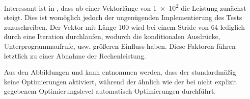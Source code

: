 Interessant ist in , dass ab einer Vektorlänge von \num{1e2} die
Leistung zunächst steigt. Dies ist womöglich jedoch der ungenügenden Implementierung
des Tests zuzuschreiben. Der Vektor mit Länge 100 wird bei einem Stride von 64
lediglich durch eine Iteration durchlaufen, wodurch die konditionalen Ausdrücke,
Unterprogrammaufrufe, usw. größeren Einfluss haben. Diese Faktoren führen letztlich
zu einer Abnahme der Rechenleistung.

Aus den Abbildungen  und  kann entnommen werden,
dass der \gcc standardmäßig keine Optimierungen aktiviert, während der \icc ähnlich
wie der \pgcc bei nicht explizit gegebenem Optimierungslevel automatisch Optimierungen
durchführt.
